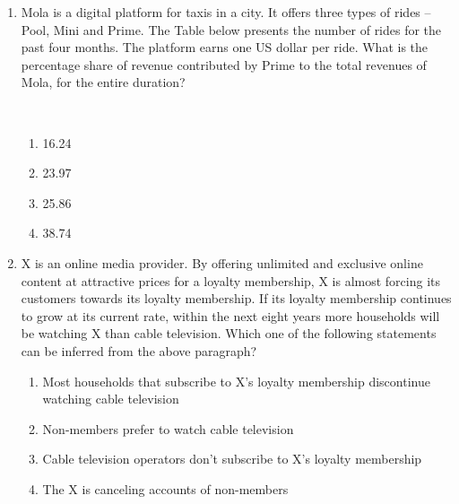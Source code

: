 \documentclass[journal,12pt,onecolumn]{IEEEtran}
\begin{document}
\begin{enumerate}[label=\arabic*)]
\vspace{0.5cm}

\item Mola is a digital platform for taxis in a city. It offers three types of rides -- Pool, Mini and Prime. The Table below presents the number of rides for the past four months. The platform earns one US dollar per ride. What is the percentage share of revenue contributed by Prime to the total revenues of Mola, for the entire duration?

\vspace{0.5em}



\hfill{} \\

\vspace{0.2cm}
\begin{enumerate}[label=\alph*)]
\item 16.24
\item 23.97
\item 25.86
\item 38.74
\end{enumerate}

\vspace{0.5cm}

\item X is an online media provider. By offering unlimited and exclusive online content at attractive prices for a loyalty membership, X is almost forcing its customers towards its loyalty membership. If its loyalty membership continues to grow at its current rate, within the next eight years more households will be watching X than cable television. Which one of the following statements can be inferred from the above paragraph?
\hfill{} \\

\vspace{0.2cm}
\begin{enumerate}[label=\alph*)]
\item Most households that subscribe to X’s loyalty membership discontinue watching cable television
\item Non-members prefer to watch cable television
\item Cable television operators don’t subscribe to X’s loyalty membership
\item The X is canceling accounts of non-members
\end{enumerate}

\end{enumerate}
\end{document}
